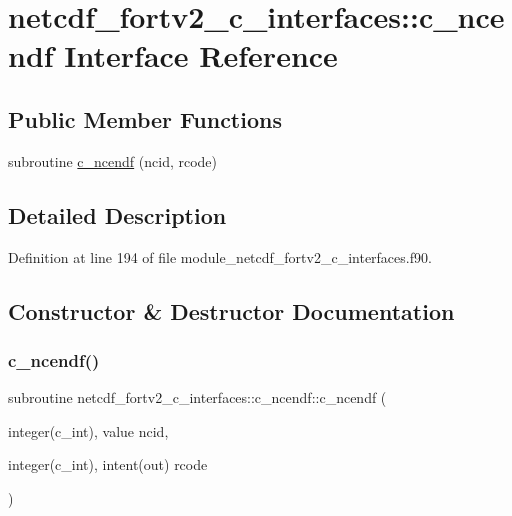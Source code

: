 \hypertarget{interfacenetcdf__fortv2__c__interfaces_1_1c__ncendf}{}\section{netcdf\+\_\+fortv2\+\_\+c\+\_\+interfaces\+:\+:c\+\_\+ncendf Interface Reference}
\label{interfacenetcdf__fortv2__c__interfaces_1_1c__ncendf}
\subsection*{Public Member Functions}
\begin{DoxyCompactItemize}
\item 
subroutine \hyperlink{interfacenetcdf__fortv2__c__interfaces_1_1c__ncendf_a16923ec431b3cfec5a6bfd1e26987435}{c\+\_\+ncendf} (ncid, rcode)
\end{DoxyCompactItemize}


\subsection{Detailed Description}


Definition at line 194 of file module\+\_\+netcdf\+\_\+fortv2\+\_\+c\+\_\+interfaces.\+f90.



\subsection{Constructor \& Destructor Documentation}
\mbox{\label{interfacenetcdf__fortv2__c__interfaces_1_1c__ncendf_a16923ec431b3cfec5a6bfd1e26987435}} 
\subsubsection{\texorpdfstring{c\+\_\+ncendf()}{c\_ncendf()}}
{\footnotesize\ttfamily subroutine netcdf\+\_\+fortv2\+\_\+c\+\_\+interfaces\+::c\+\_\+ncendf\+::c\+\_\+ncendf (\begin{DoxyParamCaption}\item[{integer(c\+\_\+int), value}]{ncid,  }\item[{integer(c\+\_\+int), intent(out)}]{rcode }\end{DoxyParamCaption})}



